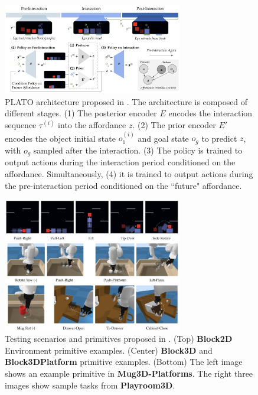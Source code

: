 \begin{figure}[t]
    \centering
    \includegraphics[width=0.7\textwidth]{figures/images/plato/plato.jpg}
    \caption{PLATO architecture proposed in \cite{belkhale2023plato}. The architecture is composed of different stages. (1) The posterior encoder \( E \) encodes the interaction sequence \( \tau^{(i)} \) into the affordance \( z \). (2) The prior encoder \( E' \) encodes the object initial state \( o^{(i)}_1 \) and goal state \( o_g \) to predict \( z \), with \( o_g \) sampled after the interaction. (3) The policy is trained to output actions during the interaction period conditioned on the affordance. Simultaneously, (4) it is trained to output actions during the pre-interaction period conditioned on the ``future" affordance.
    }
    \label{fig:plato}
    
\end{figure}

\begin{figure}[t]
    \centering
    \includegraphics[width=0.7\textwidth]{figures/images/plato/tasks.jpg}
    \caption{ Testing scenarios and primitives proposed in \cite{belkhale2023plato}. (Top) \textbf{Block2D} Environment primitive examples. (Center) \textbf{Block3D} and \textbf{Block3DPlatform} primitive examples. (Bottom) The left image shows an example primitive in \textbf{Mug3D-Platforms}. The right three images show sample tasks from \textbf{Playroom3D}.}
    \label{fig:plato_task}
    
\end{figure}